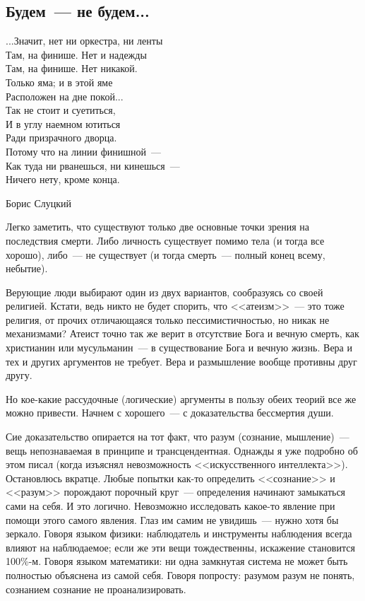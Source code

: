 \documentclass{scrbook}
\makeatletter
\newcommand{\bigepigraphwidth}{0.8} %
\newcommand{\defaultepigraphwidth}{0.5} %
\newcommand{\flqq}{<<}
\newcommand{\frqq}{>>}
\newcommand{\mdash}{~--- }
\newcommand{\essaysection}[1]{\subsection*{#1}\nopagebreak}
\newcommand{\myepigraph}[3][\@empty]{
	\ifx\@empty#1
		\setlength{\epigraphwidth}{\defaultepigraphwidth\textwidth}
	\else
		\setlength{\epigraphwidth}{#1\textwidth}
	\fi
	\epigraph{#2}{#3}
	\setlength{\epigraphwidth}{\defaultepigraphwidth\textwidth} %
	\nopagebreak
}
\makeatother
\begin{document}
\essaysection{Будем{\mdash}не будем...}

\myepigraph[\bigepigraphwidth]{...Значит, нет ни оркестра, ни ленты \\
Там, на финише. Нет и надежды \\
Там, на финише. Нет никакой. \\
Только яма; и в этой яме \\
Расположен на дне покой... \\
Так не стоит и суетиться, \\
И в углу наемном ютиться \\
Ради призрачного дворца. \\
Потому что на линии финишной{\mdash}\\
Как туда ни рванешься, ни кинешься{\mdash}\\
Ничего нету, кроме конца\footnotemark.}
{Борис Слуцкий}

Легко заметить, что существуют только две основные точки зрения на последствия смерти. Либо личность существует помимо тела (и тогда все хорошо), либо{\mdash}не существует (и тогда смерть{\mdash}полный конец всему, небытие).

Верующие люди выбирают один из двух вариантов, сообразуясь со своей религией. Кстати, ведь никто не будет спорить, что {\flqq}атеизм{\frqq}{\mdash}это тоже религия, от прочих отличающаяся только пессимистичностью, но никак не механизмами? Атеист точно так же верит в отсутствие Бога и вечную смерть, как христианин или мусульманин{\mdash}в существование Бога и вечную жизнь. Вера и тех и других аргументов не требует. Вера и размышление вообще противны друг другу.

Но кое-какие рассудочные (логические) аргументы в пользу обеих теорий все же можно привести. Начнем с хорошего{\mdash}с доказательства бессмертия души.

Сие доказательство опирается на тот факт, что разум (сознание, мышление){\mdash}вещь непознаваемая в принципе и трансцендентная. Однажды я уже подробно об этом писал (когда изъяснял невозможность {\flqq}искусственного интеллекта{\frqq}). Остановлюсь вкратце. Любые попытки как-то определить {\flqq}сознание{\frqq} и {\flqq}разум{\frqq} порождают порочный круг{\mdash}определения начинают замыкаться сами на себя. И это логично. Невозможно исследовать какое-то явление при помощи этого самого явления. Глаз им самим не увидишь{\mdash}нужно хотя бы зеркало. Говоря языком физики: наблюдатель и инструменты наблюдения всегда влияют на наблюдаемое; если же эти вещи тождественны, искажение становится 100\%-м. Говоря языком математики: ни одна замкнутая система не может быть полностью объяснена из самой себя. Говоря попросту: разумом разум не понять, сознанием сознание не проанализировать.
\end{document}
